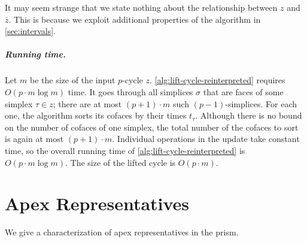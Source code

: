 \documentclass[cleveref,a4paper,english,nolineno]{socg-lipics-v2021}
\renewcommand{\paragraph}[1]{\subparagraph*{#1}}
\newcommand{\prism}[1]{\overline{#1}}
\newcommand{\pz}{\prism{z}}
\newcommand{\ssx}{\sigma}
\newcommand{\tsx}{\tau}
\begin{document}
\begin{remark*}
    It may seem strange that we state nothing about the relationship between $z$
    and $\pz$. This is because we exploit additional properties of the algorithm
    in \cref{sec:intervals}.
\end{remark*}


\paragraph{Running time.}
Let $m$ be the size of the input $p$-cycle $z$.
\cref{alg:lift-cycle-reinterpreted} requires $O(p \cdot m \log m)$ time.
It goes through all simplices $\ssx$ that are faces of some simplex $\tsx \in z$;
there are at most $(p+1) \cdot m$ such $(p-1)$-simplices. For each one, the
algorithm sorts its cofaces by their times $t_\tsx$.
Although there is no bound on the number of cofaces of one simplex, the total
number of the cofaces to sort is again at most $(p+1) \cdot m$.
Individual operations in the update take constant time, so the overall running
time of \cref{alg:lift-cycle-reinterpreted} is $O(p \cdot m \log m)$. The size of the lifted cycle is $O(p \cdot m)$.


\section{Apex Representatives}
\label{sec:apex-representatives}

We give a characterization of apex representatives in the prism.
\end{document}
